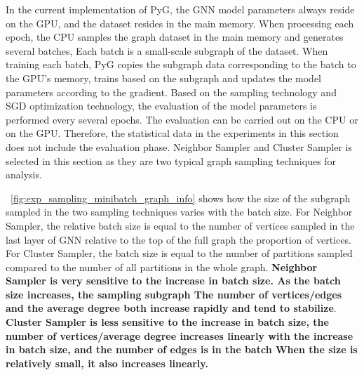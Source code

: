 In the current implementation of PyG, the GNN model parameters always reside on the GPU,
and the dataset resides in the main memory. When processing each epoch, the CPU samples
the graph dataset in the main memory and generates several batches,
Each batch is a small-scale subgraph of the dataset. When training each batch, 
PyG copies the subgraph data corresponding to the batch to the GPU's memory,
trains based on the subgraph and updates the model parameters according to the gradient.
Based on the sampling technology and SGD optimization technology, 
the evaluation of the model parameters is performed every several epochs. 
The evaluation can be carried out on the CPU or on the GPU. 
Therefore, the statistical data in the experiments in this section does not include the evaluation phase. 
Neighbor Sampler and Cluster Sampler is selected in this section as they are two typical graph sampling techniques for analysis.

\figurename~\ref{fig:exp_sampling_minibatch_graph_info} shows how the size of the subgraph sampled in the two sampling techniques varies with the batch size.
For Neighbor Sampler, the relative batch size is equal to the number of vertices sampled in the last layer of GNN relative to the top of the full graph the proportion of vertices.
For Cluster Sampler, the batch size is equal to the number of partitions sampled compared to the number of all partitions in the whole graph.
\textbf{Neighbor Sampler is very sensitive to the increase in batch size. As the batch size increases, 
the sampling subgraph The number of vertices/edges and the average degree both increase rapidly and tend to stabilize}.
\textbf{Cluster Sampler is less sensitive to the increase in batch size, the number of vertices/average degree increases
linearly with the increase in batch size, and the number of edges is in the batch When the size is relatively small,
it also increases linearly.}

